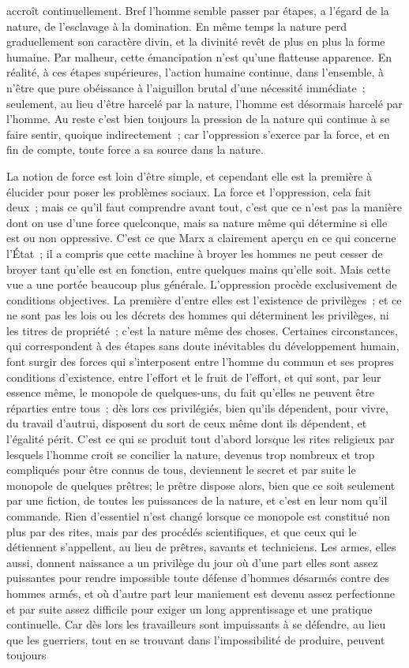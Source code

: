 \documentclass[french,twoside]{book} %
\begin{document}
accroît continuellement. Bref l'homme semble passer par étapes, a l'égard de la nature, de l'esclavage à la domination. En même temps la nature perd graduellement son caractère divin, et la divinité revêt de plus en plus la forme humaine. Par malheur, cette émancipation n'est qu'une flatteuse apparence. En réalité, à ces étapes supérieures, l'action humaine continue, dans l'ensemble, à n'être que pure obéissance à l'aiguillon brutal d'une nécessité immédiate ; seulement, au lieu d'être harcelé par la nature, l'homme est désormais harcelé par l'homme. Au reste c'est bien toujours la pression de la nature qui continue à se faire sentir, quoique indirectement ; car l'oppression s'exerce par la force, et en fin de compte, toute force a sa source dans la nature.\par
La notion de force est loin d'être simple, et cependant elle est la première à élucider pour poser les problèmes sociaux. La force et l'oppression, cela fait deux ; mais ce qu'il faut comprendre avant tout, c'est que ce n'est pas la manière dont on use d'une force quelconque, mais sa nature même qui détermine si elle est ou non oppressive. C'est ce que Marx a clairement aperçu en ce qui concerne l'État ; il a compris que cette machine à broyer les hommes ne peut cesser de broyer tant qu'elle est en fonction, entre quelques mains qu'elle soit. Mais cette vue a une portée beaucoup plus générale. L'oppression procède exclusivement de conditions objectives. La première d'entre elles est l'existence de privilèges ; et ce ne sont pas les lois ou les décrets des hommes qui déterminent les privilèges, ni les titres de propriété ; c'est la nature même des choses. Certaines circonstances, qui correspondent à des étapes sans doute inévitables du développement humain, font surgir des forces qui s'interposent entre l'homme du commun et ses propres conditions d'existence, entre l'effort et le fruit de l'effort, et qui sont, par leur essence même, le monopole de quelques-uns, du fait qu'elles ne peuvent être réparties entre tous ; dès lors ces privilégiés, bien qu'ils dépendent, pour vivre, du travail d'autrui, disposent du sort de ceux même dont ils dépendent, et l'égalité périt. C'est ce qui se produit tout d'abord lorsque les rites religieux par lesquels l'homme croit se concilier la nature, devenus trop nombreux et trop compliqués pour être connus de tous, deviennent le secret et par suite le monopole de quelques prêtres; le prêtre dispose alors, bien que ce soit seulement par une fiction, de toutes les puissances de la nature, et c'est en leur nom qu'il commande. Rien d'essentiel n'est changé lorsque ce monopole est constitué non plus par des rites, mais par des procédés scientifiques, et que ceux qui le détiennent s'appellent, au lieu de prêtres, savants et techniciens. Les armes, elles aussi, donnent naissance a un privilège du jour où d'une part elles sont assez puissantes pour rendre impossible toute défense d'hommes désarmés contre des hommes armés, et où d'autre part leur maniement est devenu assez perfectionne et par suite assez difficile pour exiger un long apprentissage et une pratique continuelle. Car dès lors les travailleurs sont impuissants à se défendre, au lieu que les guerriers, tout en se trouvant dans l'impossibilité de produire, peuvent toujours 
\end{document}
